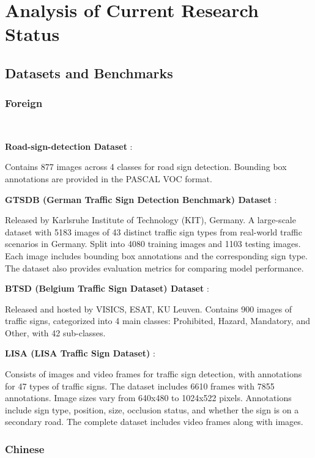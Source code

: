 \documentclass[letterpaper, 10 pt, conference]{ieeeconf}
\begin{document}
\
\section{Analysis of Current Research Status}
\hrulefill

\subsection{Datasets and Benchmarks}

\subsubsection{Foreign}\

\textbf{Road-sign-detection Dataset} \cite{make_ml}:

Contains 877 images across 4 classes for road sign detection. Bounding box annotations are provided in the PASCAL VOC format.

\textbf{GTSDB (German Traffic Sign Detection Benchmark) Dataset} \cite{Houben-IJCNN-2013}:

Released by Karlsruhe Institute of Technology (KIT), Germany. A large-scale dataset with 5183 images of 43 distinct traffic sign types from real-world traffic scenarios in Germany. Split into 4080 training images and 1103 testing images. Each image includes bounding box annotations and the corresponding sign type. The dataset also provides evaluation metrics for comparing model performance.

\textbf{BTSD (Belgium Traffic Sign Dataset) Dataset} \cite{timothefe2013traffic}:

Released and hosted by VISICS, ESAT, KU Leuven. Contains 900 images of traffic signs, categorized into 4 main classes: Prohibited, Hazard, Mandatory, and Other, with 42 sub-classes.

\textbf{LISA (LISA Traffic Sign Dataset)} \cite{mogelmose2012lisa}:

Consists of images and video frames for traffic sign detection, with annotations for 47 types of traffic signs. The dataset includes 6610 frames with 7855 annotations. Image sizes vary from 640x480 to 1024x522 pixels. Annotations include sign type, position, size, occlusion status, and whether the sign is on a secondary road. The complete dataset includes video frames along with images.

\subsubsection{Chinese}\
\end{document}
